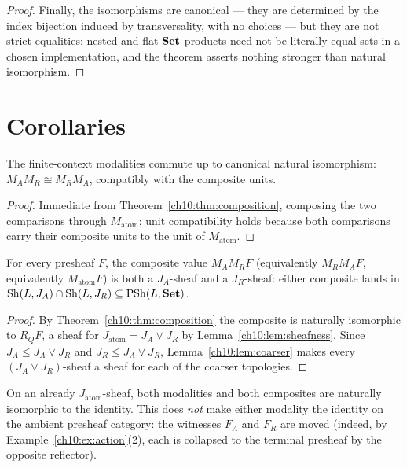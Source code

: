 \begin{proof}
Finally, the isomorphisms are canonical --- they are determined by the index
bijection induced by transversality, with no choices --- but they are not
strict equalities: nested and flat $\mathbf{Set}$-products need not be literally
equal sets in a chosen implementation, and the theorem asserts nothing
stronger than natural isomorphism.
\end{proof}

\section{Corollaries}
\label{ch10:sec:corollaries}

\begin{corollary}[Commutation]
\label{ch10:cor:commute}
The finite-context modalities commute up to canonical natural isomorphism:
$M_A M_R \cong M_R M_A$, compatibly with the composite units.
\end{corollary}

\begin{proof}
Immediate from Theorem~\ref{ch10:thm:composition}, composing the two
comparisons through $M_{\mathrm{atom}}$; unit compatibility holds because
both comparisons carry their composite units to the unit of
$M_{\mathrm{atom}}$.
\end{proof}

\begin{corollary}
\label{ch10:cor:intersection}
For every presheaf $F$, the composite value $M_A M_R F$ (equivalently
$M_R M_A F$, equivalently $M_{\mathrm{atom}} F$) is both a $J_A$-sheaf and a
$J_R$-sheaf: either composite lands in
$\mathrm{Sh}(L, J_A) \cap \mathrm{Sh}(L, J_R) \subseteq \mathrm{PSh}(L, \mathbf{Set})$.
\end{corollary}

\begin{proof}
By Theorem~\ref{ch10:thm:composition} the composite is naturally isomorphic
to $R_Q F$, a sheaf for $J_{\mathrm{atom}} = J_A \vee J_R$ by
Lemma~\ref{ch10:lem:sheafness}. Since $J_A \le J_A \vee J_R$ and
$J_R \le J_A \vee J_R$, Lemma~\ref{ch10:lem:coarser} makes every
$(J_A \vee J_R)$-sheaf a sheaf for each of the coarser topologies.
\end{proof}

\begin{corollary}
\label{ch10:cor:atomicfix}
On an already $J_{\mathrm{atom}}$-sheaf, both modalities and both composites
are naturally isomorphic to the identity. This does \emph{not} make either
modality the identity on the ambient presheaf category: the witnesses $F_A$
and $F_R$ are moved (indeed, by Example~\ref{ch10:ex:action}(2), each is
collapsed to the terminal presheaf by the opposite reflector).
\end{corollary}

